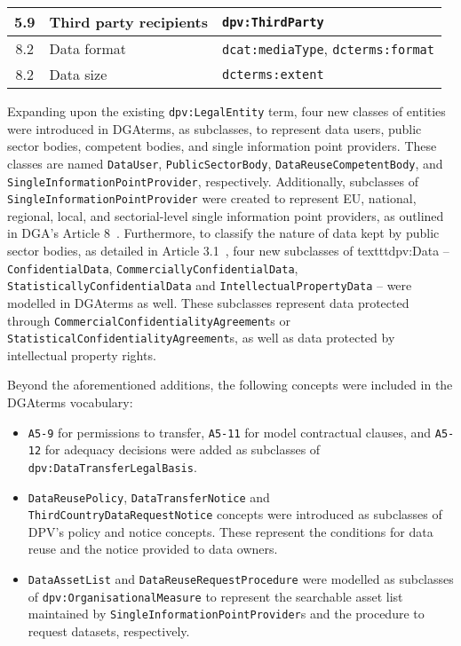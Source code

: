 \begin{table}[ht]
\begin{tabular}{c||l|l}
5.9 & Third party recipients & \texttt{dpv:ThirdParty} \\ \hline
8.2 & Data format & \texttt{dcat:mediaType}, \texttt{dcterms:format}\\ \hline
8.2 & Data size & \texttt{dcterms:extent} \\          
\end{tabular}
\end{table}

Expanding upon the existing \texttt{dpv:LegalEntity} term, four new classes of entities were introduced in DGAterms, as subclasses, to represent data users, public sector bodies, competent bodies, and single information point providers.
These classes are named \texttt{DataUser}, \texttt{PublicSectorBody}, \texttt{DataReuseCompetentBody}, and \texttt{SingleInformationPointProvider}, respectively.
Additionally, subclasses of \texttt{SingleInformationPointProvider} were created to represent EU, national, regional, local, and sectorial-level single information point providers, as outlined in DGA's Article 8~\citeyearpar{noauthor_regulation_2022}.
Furthermore, to classify the nature of data kept by public sector bodies, as detailed in Article 3.1~\citeyearpar{noauthor_regulation_2022}, four new subclasses of texttt{dpv:Data} -- \texttt{ConfidentialData}, \texttt{CommerciallyConfidentialData}, \texttt{StatisticallyConfidentialData} and \texttt{IntellectualPropertyData} -- were modelled in DGAterms as well.
These subclasses represent data protected through \texttt{CommercialConfidentialityAgreement}s or \texttt{StatisticalConfidentialityAgreement}s, as well as data protected by intellectual property rights.

Beyond the aforementioned additions, the following concepts were included in the DGAterms vocabulary:
\begin{itemize}
    \item \texttt{A5-9} for permissions to transfer, \texttt{A5-11} for model contractual clauses, and \texttt{A5-12} for adequacy decisions were added as subclasses of \texttt{dpv:DataTransferLegalBasis}.
    \item \texttt{DataReusePolicy}, \texttt{DataTransferNotice} and \texttt{ThirdCountryDataRequestNotice} concepts were introduced as subclasses of DPV's policy and notice concepts. These represent the conditions for data reuse and the notice provided to data owners.
    \item \texttt{DataAssetList} and \texttt{DataReuseRequestProcedure} were modelled as subclasses of \texttt{dpv:OrganisationalMeasure} to represent the searchable asset list maintained by \texttt{SingleInformationPointProvider}s and the procedure to request datasets, respectively.
\end{itemize}

